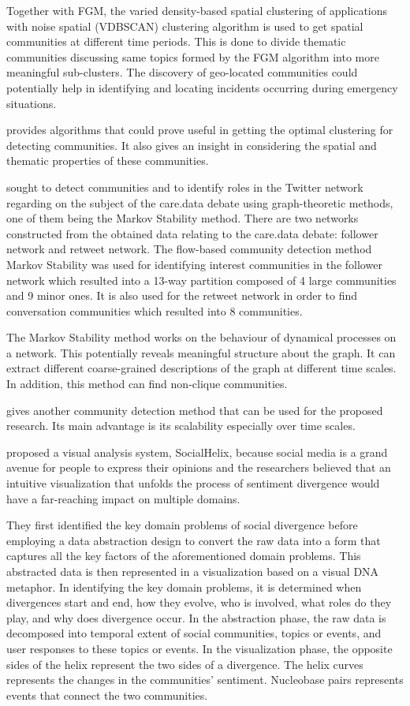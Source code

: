 Together with FGM, the varied density-based spatial clustering of applications with noise spatial (VDBSCAN) clustering algorithm is used to get spatial communities at different time periods. This is done to divide thematic communities discussing same topics formed by the FGM algorithm into more meaningful sub-clusters. The discovery of geo-located communities could potentially help in identifying and locating incidents occurring during emergency situations.

 provides algorithms that could prove useful in getting the optimal clustering for detecting communities. It also gives an insight in considering the spatial and thematic properties of these communities.

 sought to detect communities and to identify roles in the Twitter network regarding on the subject of the care.data debate using graph-theoretic methods, one of them being the Markov Stability method. There are two networks constructed from the obtained data relating to the care.data debate: follower network and retweet network. The flow-based community detection method Markov Stability was used for identifying interest communities in the follower network which resulted into a 13-way partition composed of 4 large communities and 9 minor ones. It is also used for the retweet network in order to find conversation communities which resulted into 8 communities. 

The Markov Stability method works on the behaviour of dynamical processes on a network. This potentially reveals meaningful structure about the graph. It can extract different coarse-grained descriptions of the graph at different time scales. In addition, this method can find non-clique communities.

 gives another community detection method that can be used for the proposed research. Its main advantage is its scalability especially over time scales.

 proposed a visual analysis system, SocialHelix, because social media is a grand avenue for people to express their opinions and the researchers believed that an intuitive visualization that unfolds the process of sentiment divergence would have a far-reaching impact on multiple domains. 

They first identified the key domain problems of social divergence before employing a data abstraction design to convert the raw data into a form that captures all the key factors of the aforementioned domain problems. This abstracted data is then represented in a visualization based on a visual DNA metaphor. In identifying the key domain problems, it is determined when divergences start and end, how they evolve, who is involved, what roles do they play, and why does divergence occur. In the abstraction phase, the raw data is decomposed into temporal extent of social communities, topics or events, and user responses to these topics or events. In the visualization phase, the opposite sides of the helix represent the two sides of a divergence. The helix curves represents the changes in the communities’ sentiment. Nucleobase pairs represents events that connect the two communities. 

